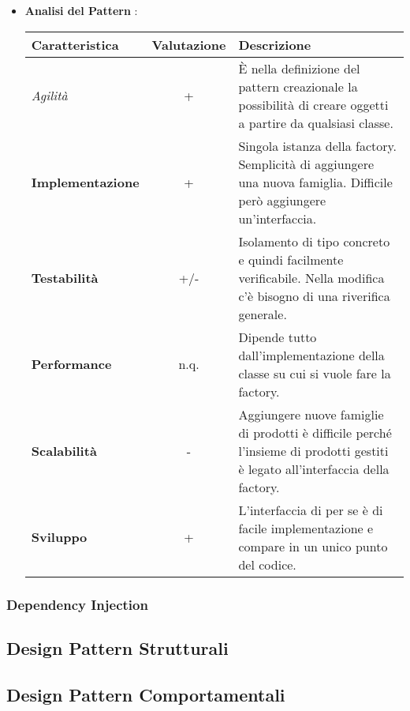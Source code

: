 {{{\begin{itemize}
				\item \textbf{Analisi del Pattern} :
				\small %
				{\renewcommand\arraystretch{1.2} %
					\begin{tabular}{|l|c|l|}
						\hline
						{\textbf{Caratteristica}}&{\textbf{Valutazione}}&{\textbf{Descrizione}}\\
						\hline
						\textit{Agilità} & + & È nella definizione del pattern creazionale la possibilità di creare oggetti a partire da qualsiasi classe. \\
						\hline
						\textbf{Implementazione} & + & Singola istanza della factory. Semplicità di aggiungere una nuova famiglia. Difficile però aggiungere un'interfaccia. \\
						\hline
						\textbf{Testabilità} & +/- & Isolamento di tipo concreto e quindi facilmente verificabile. Nella modifica c'è bisogno di una riverifica generale. \\
						\hline
						\textbf{Performance} & n.q. & Dipende tutto dall'implementazione della classe su cui si vuole fare la factory. \\
						\hline
						\textbf{Scalabilità} & - & Aggiungere nuove famiglie di prodotti è difficile perché l’insieme di prodotti gestiti è legato all'interfaccia della factory. \\
						\hline
						\textbf{Sviluppo} & + & L'interfaccia di per se è di facile implementazione e compare in un unico punto del codice. \\
						\hline
					\end{tabular}
				}
			\end{itemize}
		}
	
		\subsubsection{Dependency Injection}{
		}	
	}
	\subsection{Design Pattern Strutturali}{
		
	}
	\subsection{Design Pattern Comportamentali}{
		
	}
}